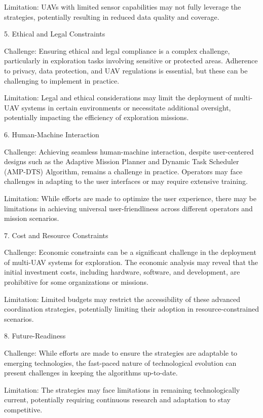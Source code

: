 \documentclass[sigconf]{acmart}
\begin{document}
    Limitation: UAVs with limited sensor capabilities may not fully leverage the strategies, potentially resulting in reduced data quality and coverage.

5. Ethical and Legal Constraints

    Challenge: Ensuring ethical and legal compliance is a complex challenge, particularly in exploration tasks involving sensitive or protected areas. Adherence to privacy, data protection, and UAV regulations is essential, but these can be challenging to implement in practice.

    Limitation: Legal and ethical considerations may limit the deployment of multi-UAV systems in certain environments or necessitate additional oversight, potentially impacting the efficiency of exploration missions.

6. Human-Machine Interaction

    Challenge: Achieving seamless human-machine interaction, despite user-centered designs such as the Adaptive Mission Planner and Dynamic Task Scheduler (AMP-DTS) Algorithm, remains a challenge in practice. Operators may face challenges in adapting to the user interfaces or may require extensive training.

    Limitation: While efforts are made to optimize the user experience, there may be limitations in achieving universal user-friendliness across different operators and mission scenarios.

7. Cost and Resource Constraints

    Challenge: Economic constraints can be a significant challenge in the deployment of multi-UAV systems for exploration. The economic analysis may reveal that the initial investment costs, including hardware, software, and development, are prohibitive for some organizations or missions.

    Limitation: Limited budgets may restrict the accessibility of these advanced coordination strategies, potentially limiting their adoption in resource-constrained scenarios.

8. Future-Readiness

    Challenge: While efforts are made to ensure the strategies are adaptable to emerging technologies, the fast-paced nature of technological evolution can present challenges in keeping the algorithms up-to-date.

    Limitation: The strategies may face limitations in remaining technologically current, potentially requiring continuous research and adaptation to stay competitive.
\end{document}
